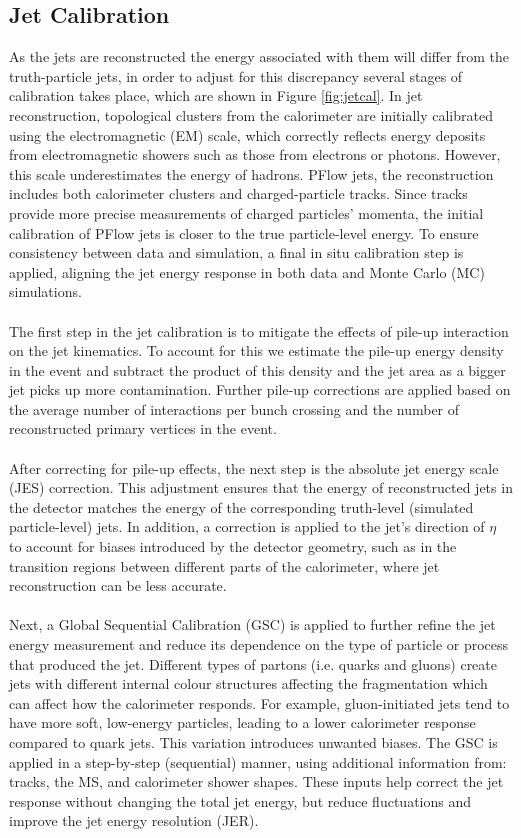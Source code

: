 \subsection{Jet Calibration}
As the jets are reconstructed the energy associated with them will differ from the truth-particle jets, in order to adjust for this discrepancy several stages of calibration takes place, which are shown in Figure \ref{fig:jetcal}. In jet reconstruction, topological clusters from the calorimeter are initially calibrated using the electromagnetic (EM) scale, which correctly reflects energy deposits from electromagnetic showers such as those from electrons or photons. However, this scale underestimates the energy of hadrons. PFlow jets, the reconstruction includes both calorimeter clusters and charged-particle tracks. Since tracks provide more precise measurements of charged particles’ momenta, the initial calibration of PFlow jets is closer to the true particle-level energy. To ensure consistency between data and simulation, a final in situ calibration step is applied, aligning the jet energy response in both data and Monte Carlo (MC) simulations. \\
\\
The first step in the jet calibration is to mitigate the effects of pile-up interaction on the jet kinematics.  To account for this we estimate the pile-up energy density in the event and subtract the product of this density and the jet area as a bigger jet picks up more contamination. Further pile-up corrections are applied based on the average number of interactions per bunch crossing and the number of reconstructed primary vertices in the event.
\\
\\
After correcting for pile-up effects, the next step is the absolute jet energy scale (JES) correction. This adjustment ensures that the energy of reconstructed jets in the detector matches the energy of the corresponding truth-level (simulated particle-level) jets. In addition, a correction is applied to the jet’s direction of $\eta$ to account for biases introduced by the detector geometry, such as in the transition regions between different parts of the calorimeter, where jet reconstruction can be less accurate.
\\
\\
Next, a Global Sequential Calibration (GSC) is applied to further refine the jet energy measurement and reduce its dependence on the type of particle or process that produced the jet. Different types of partons (i.e. quarks and gluons) create jets with different internal colour structures affecting the fragmentation which can affect how the calorimeter responds. For example, gluon-initiated jets tend to have more soft, low-energy particles, leading to a lower calorimeter response compared to quark jets. This variation introduces unwanted biases. The GSC is applied in a step-by-step (sequential) manner, using additional information from: tracks, the MS, and calorimeter shower shapes. These inputs help correct the jet response without changing the total jet energy, but reduce fluctuations and improve the jet energy resolution (JER).

